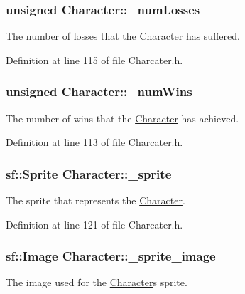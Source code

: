 \subsubsection[{\+\_\+num\+Losses}]{\setlength{\rightskip}{0pt plus 5cm}unsigned Character\+::\+\_\+num\+Losses\hspace{0.3cm}{\ttfamily [protected]}}\label{class_character_a0f2af69ac7a82ebff650b1a430bb4331}
The number of losses that the \hyperlink{class_character}{Character} has suffered. 

Definition at line 115 of file Charcater.\+h.

\hypertarget{class_character_a68d70b5ab4f09cd2a74524fc3d162d3d}{}
\subsubsection[{\+\_\+num\+Wins}]{\setlength{\rightskip}{0pt plus 5cm}unsigned Character\+::\+\_\+num\+Wins\hspace{0.3cm}{\ttfamily [protected]}}\label{class_character_a68d70b5ab4f09cd2a74524fc3d162d3d}
The number of wins that the \hyperlink{class_character}{Character} has achieved. 

Definition at line 113 of file Charcater.\+h.

\hypertarget{class_character_ab3b89d967b817bc3e199ed70f6b6277a}{}
\subsubsection[{\+\_\+sprite}]{\setlength{\rightskip}{0pt plus 5cm}sf\+::\+Sprite Character\+::\+\_\+sprite\hspace{0.3cm}{\ttfamily [protected]}}\label{class_character_ab3b89d967b817bc3e199ed70f6b6277a}
The sprite that represents the \hyperlink{class_character}{Character}. 

Definition at line 121 of file Charcater.\+h.

\hypertarget{class_character_a1a8bdd55f5f5ec76eabc83c28f0207e4}{}
\subsubsection[{\+\_\+sprite\+\_\+image}]{\setlength{\rightskip}{0pt plus 5cm}sf\+::\+Image Character\+::\+\_\+sprite\+\_\+image\hspace{0.3cm}{\ttfamily [protected]}}\label{class_character_a1a8bdd55f5f5ec76eabc83c28f0207e4}
The image used for the \hyperlink{class_character}{Character}\textquotesingle{}s sprite. 

